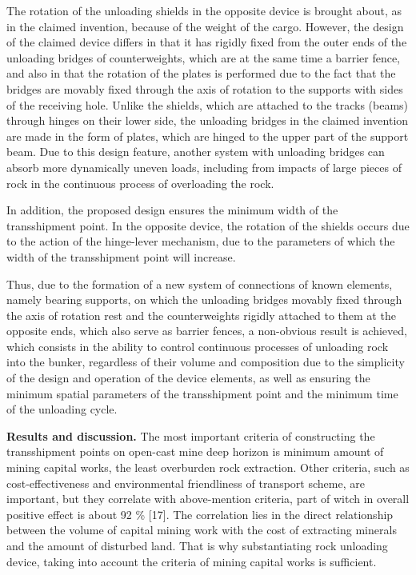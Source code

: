 The rotation of the unloading shields in the opposite device is brought
about, as in the claimed invention, because of the weight of the cargo.
However, the design of the claimed device differs in that it has rigidly
fixed from the outer ends of the unloading bridges of counterweights,
which are at the same time a barrier fence, and also in that the
rotation of the plates is performed due to the fact that the bridges are
movably fixed through the axis of rotation to the supports with sides of
the receiving hole. Unlike the shields, which are attached to the tracks
(beams) through hinges on their lower side, the unloading bridges in the
claimed invention are made in the form of plates, which are hinged to
the upper part of the support beam. Due to this design feature, another
system with unloading bridges can absorb more dynamically uneven loads,
including from impacts of large pieces of rock in the continuous process
of overloading the rock.

In addition, the proposed design ensures the minimum width of the
transshipment point. In the opposite device, the rotation of the shields
occurs due to the action of the hinge-lever mechanism, due to the
parameters of which the width of the transshipment point will increase.

Thus, due to the formation of a new system of connections of known
elements, namely bearing supports, on which the unloading bridges
movably fixed through the axis of rotation rest and the counterweights
rigidly attached to them at the opposite ends, which also serve as
barrier fences, a non-obvious result is achieved, which consists in the
ability to control continuous processes of unloading rock into the
bunker, regardless of their volume and composition due to the simplicity
of the design and operation of the device elements, as well as ensuring
the minimum spatial parameters of the transshipment point and the
minimum time of the unloading cycle.

{\bfseries Results and discussion.} The most important criteria of
constructing the transshipment points on open-cast mine deep horizon is
minimum amount of mining capital works, the least overburden rock
extraction. Other criteria, such as cost-effectiveness and environmental
friendliness of transport scheme, are important, but they correlate with
above-mention criteria, part of witch in overall positive effect is
about 92 \% {[}17{]}. The correlation lies in the direct relationship
between the volume of capital mining work with the cost of extracting
minerals and the amount of disturbed land. That is why substantiating
rock unloading device, taking into account the criteria of mining
capital works is sufficient.

